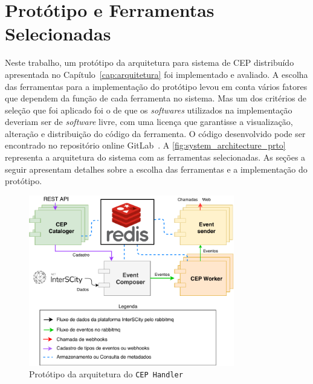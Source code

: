 \chapter{Protótipo e Ferramentas Selecionadas}
\label{cap:prototype}






Neste trabalho, um protótipo da arquitetura para sistema de CEP distribuído apresentada no Capítulo~\ref{cap:arquitetura} foi implementado e avaliado. 
A escolha das ferramentas para a implementação do protótipo levou em conta vários fatores que dependem da função de cada ferramenta no sistema. Mas um dos critérios de seleção que foi aplicado foi o de que os \textit{softwares} utilizados na implementação deveriam ser de \textit{software} livre, com uma licença que garantisse a visualização,  alteração e distribuição do código da ferramenta. O código desenvolvido pode ser encontrado no repositório online GitLab~\citep{CEPHandler}. A \autoref{fig:system_architecture_prto} representa a arquitetura do sistema com as ferramentas selecionadas.
As seções a seguir apresentam detalhes sobre a escolha das ferramentas e a implementação do protótipo.


\begin{figure}[hb!]
      \centering
      \includegraphics[width=0.8\textwidth]{figuras/graphics/prot_dia.pdf}
      \caption{Protótipo da arquitetura do \texttt{CEP Handler}}
      \label{fig:system_architecture_prto}
\end{figure}

